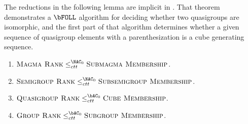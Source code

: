 \documentclass{article}
\begin{document}
The reductions in the following lemma are implicit in \autocite[Theorem~3.4]{ctw13}.
That theorem demonstrates a $\bFOLL$ algorithm for deciding whether two quasigroups are isomorphic, and the first part of that algorithm determines whether a given sequence of quasigroup elements with a parenthesization is a cube generating sequence.

\begin{lemma}\label{lem:ranktomem}
  \mbox{}
  \begin{enumerate}
  \item $\textsc{Magma Rank} \leq^{\NAC_0}_{ctt} \textsc{Submagma Membership}$.
  \item $\textsc{Semigroup Rank} \leq^{\NAC_0}_{ctt} \textsc{Subsemigroup Membership}$.
  \item $\textsc{Quasigroup Rank} \leq^{\bAC_0}_{ctt} \textsc{Cube Membership}$.
  \item $\textsc{Group Rank} \leq^{\bAC_0}_{ctt} \textsc{Subgroup Membership}$.
  \end{enumerate}
\end{lemma}
\end{document}
